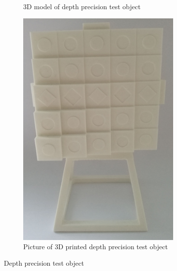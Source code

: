 \begin{figure}[ht]
  \centering
  \begin{subfigure}[t]{0.45\textwidth}
    \centering{}
    \caption{3D model of depth precision test object}
    \label{fig:3dpretest}
  \end{subfigure}\hspace{0.5cm}
  \begin{subfigure}[t]{0.45\textwidth}
    \centering\includegraphics[width=0.9\textwidth]{figures/testobject_foot}
    \caption{Picture of 3D printed depth precision test object}
    \label{fig:3dpretestpic}
  \end{subfigure}
  \caption{Depth precision test object \label{fig:3dpreobj}}
\end{figure}
